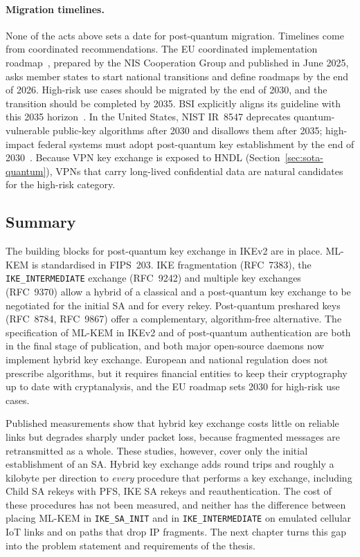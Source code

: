 \paragraph{Migration timelines.}
None of the acts above sets a date for post-quantum migration. Timelines come
from coordinated recommendations. The EU coordinated implementation
roadmap~\cite{euPqcRoadmap}, prepared by the NIS Cooperation Group and
published in June 2025, asks member states to start national transitions and
define roadmaps by the end of 2026. High-risk use cases should be migrated by
the end of 2030, and the transition should be completed by 2035. BSI explicitly aligns its guideline with this 2035
horizon~\cite{bsiTr02102}. In the United States, NIST IR~8547 deprecates
quantum-vulnerable public-key algorithms after 2030 and disallows them after
2035; high-impact federal systems must adopt post-quantum key establishment by
the end of 2030~\cite{nistir8547}. Because VPN key
exchange is exposed to HNDL (Section~\ref{sec:sota-quantum}), VPNs that carry
long-lived confidential data are natural candidates for the high-risk
category.

\subsection{Summary}
\label{sec:sota-summary}

The building blocks for post-quantum key exchange in IKEv2 are in place.
ML-KEM is standardised in FIPS~203. IKE fragmentation (RFC~7383), the
\texttt{IKE\_INTERMEDIATE} exchange (RFC~9242) and multiple key exchanges
(RFC~9370) allow a hybrid of a classical and a post-quantum key exchange to be
negotiated for the initial SA and for every rekey. Post-quantum preshared keys
(RFC~8784, RFC~9867) offer a complementary, algorithm-free alternative. The
specification of ML-KEM in IKEv2 and of post-quantum authentication are both
in the final stage of publication, and both major open-source daemons now
implement hybrid key exchange. European and national regulation does not
prescribe algorithms, but it requires financial entities to keep their
cryptography up to date with cryptanalysis, and the EU roadmap sets 2030 for
high-risk use cases.

Published measurements show that hybrid key exchange costs little on
reliable links but degrades sharply under packet loss, because fragmented
messages are retransmitted as a whole. These studies, however, cover only the
initial establishment of an SA. Hybrid key
exchange adds round trips and roughly a kilobyte per direction to
\emph{every} procedure that performs a key exchange, including Child SA rekeys
with PFS, IKE SA rekeys and reauthentication. The cost of these procedures has not been
measured, and neither has the difference between placing ML-KEM in
\texttt{IKE\_SA\_INIT} and in \texttt{IKE\_INTERMEDIATE} on emulated cellular
IoT links and on paths that drop IP fragments. The next
chapter turns this gap into the problem statement and requirements of the
thesis.
